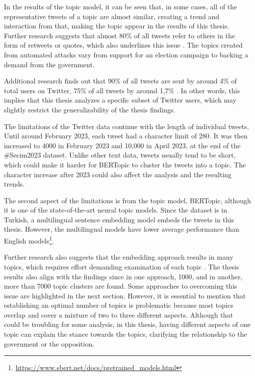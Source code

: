 In the results of the topic model, it can be seen that, in some cases, all of the representative tweets of 
a topic are almost similar, creating a trend and interaction from that, making the topic appear in the 
results of this thesis. Further research suggests that almost 80\% of all tweets refer to others in the 
form of retweets or quotes, which also underlines this issue 
\parencite{pfeffer_twitter_24_Hours_just_another_day_2023}. The topics created from automated attacks 
vary from support for an election campaign to backing a demand from the government.

Additional research finds out that 90\% of all tweets are sent by around 4\% of total users on Twitter, 
75\% of all tweets by around 1,7\% \parencite{pfeffer_twitter_24_Hours_just_another_day_2023}. 
In other words, this implies that this thesis analyzes a specific subset of Twitter users, which may 
slightly restrict the generalizability of the thesis findings.

The limitations of the Twitter data continue with the length of individual tweets. Until around February 
2023, each tweet had a character limit of 280. It was then increased to 4000 in February 2023 and 10,000 
in April 2023, at the end of the \#Secim2023 dataset. Unlike other text data, tweets usually tend to be 
short, which could make it harder for BERTopic to cluster the tweets into a topic. The character increase 
after 2023 could also affect the analysis and the resulting trends.

The second aspect of the limitations is from the topic model, BERTopic, although it is one of the 
state-of-the-art neural topic models. Since the dataset is in Turkish, a multilingual sentence embedding 
model embeds the tweets in this thesis. However, the multilingual models have lower average performance 
than English models\footnote{\url{https://www.sbert.net/docs/pretrained_models.html}}. 

Further research also suggests that the embedding approach results in many topics, which requires effort 
demanding examination of each topic \parencite{topic_model_comparison_bertopic_2022}. The thesis results 
also align with the findings since in one approach, 1000, and in another, more than 7000 topic clusters 
are found. Some approaches to overcoming this issue are highlighted in the next section. However, it 
is essential to mention that establishing an optimal number of topics is problematic because most topics 
overlap and cover a mixture of two to three different aspects. Although that could be troubling for some 
analysis, in this thesis, having different aspects of one topic can explain the stance towards the topics, 
clarifying the relationship to the government or the opposition.

